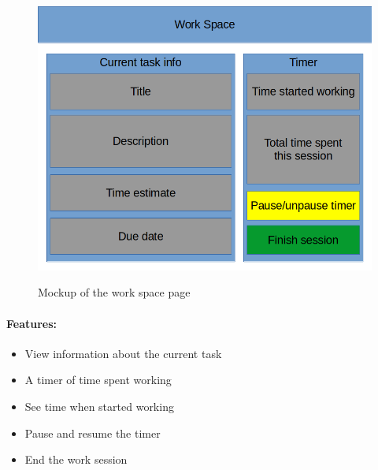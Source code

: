 \documentclass{article}
\begin{document}
\begin{minipage}{0.5\textwidth}
	\begin{figure}[H]
		\includegraphics[width=\linewidth]{Mockups/study_space.png}
		\label{fig:work_space_mockup}
		\caption{Mockup of the work space page}
	\end{figure}
\end{minipage} \hfill
\begin{minipage}{0.45\textwidth}
	\paragraph{Features:}
	\begin{samepage}
		\begin{itemize}
			\item View information about the current task
			\item A timer of time spent working
			\item See time when started working
			\item Pause and resume the timer
			\item End the work session
		\end{itemize}
	\end{samepage}
\end{minipage}
\end{document}
